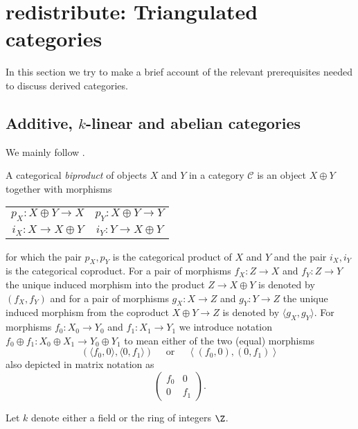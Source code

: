 \section{\textsf{redistribute: }Triangulated categories}

In this section we try to make a brief account of the relevant prerequisites needed to discuss derived categories.

\subsection{Additive, $k$-linear and abelian categories}

We mainly follow \cite{kashiwara2006categories}.

A categorical \emph{biproduct} of objects $X$ and $Y$ in a category $\mathcal C$ is an object $X \oplus Y$ together with morphisms
\begin{center}
    \begin{tabular}{c c}
        $p_X\colon X \oplus Y \to X$ & $p_Y\colon X \oplus Y \to Y$ \\
        $i_X\colon X \to X \oplus Y$ & $i_Y\colon Y \to X \oplus Y$ \\
    \end{tabular}
\end{center}
for which the pair $p_X, p_Y$ is the categorical product of $X$ and $Y$ and the pair $i_X, i_Y$ is the categorical coproduct. For a pair of morphisms $f_X \colon Z \to X$ and $f_Y \colon Z \to Y$ the unique induced morphism into the product $Z \to X \oplus Y$ is denoted by $(f_X, f_Y)$ and for a pair of morphisms $g_X \colon X \to Z$ and $g_Y \colon Y \to Z$ the unique induced morphism from the coproduct $X \oplus Y \to Z$ is denoted by $\langle g_X, g_Y \rangle$. For morphisms $f_0 \colon X_0 \to Y_0$ and $f_1 \colon X_1 \to Y_1$ we introduce notation $f_0 \oplus f_1 \colon X_0 \oplus X_1 \to Y_0 \oplus Y_1$ to mean either of the two (equal) morphisms 
\[
    \left(\langle f_0, 0 \rangle, \langle 0, f_1 \rangle\right) 
    \quad \text{ or } \quad 
    \left\langle (f_0, 0), (0, f_1)\right\rangle
\]
also depicted in matrix notation as
\[  
    \begin{pmatrix}
        f_0 & 0 \\
        0 & f_1
    \end{pmatrix}.
\]

Let $k$ denote either a field or the ring of integers $\Z$.


